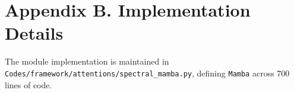 \section*{Appendix B. Implementation Details}
The module implementation is maintained in \texttt{Codes/framework/attentions/spectral\_mamba.py}, defining \texttt{Mamba} across 700 lines of code.

